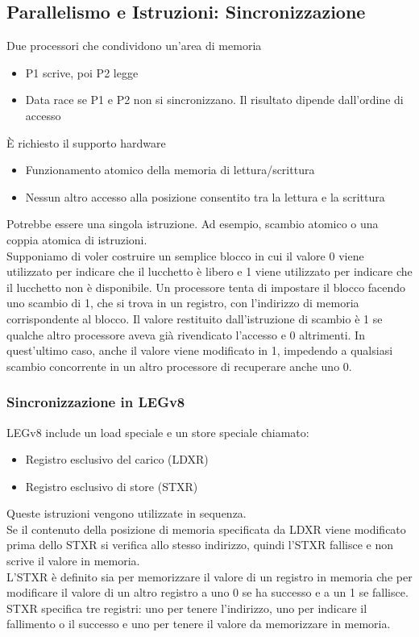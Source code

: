 \documentclass[12pt,a4paper]{article}
\begin{document}
\subsection{Parallelismo e Istruzioni: Sincronizzazione}
Due processori che condividono un'area di memoria\begin{itemize}
\item P1 scrive, poi P2 legge
\item Data race se P1 e P2 non si sincronizzano. Il risultato dipende dall'ordine di accesso
\end{itemize}
È richiesto il supporto hardware
\begin{itemize}
\item Funzionamento atomico della memoria di lettura/scrittura
\item Nessun altro accesso alla posizione consentito tra la lettura e la scrittura
\end{itemize}
Potrebbe essere una singola istruzione. Ad esempio, scambio atomico o una coppia atomica di istruzioni.\\
Supponiamo di voler costruire un semplice blocco in cui il valore 0 viene utilizzato per indicare che il lucchetto è libero e 1 viene utilizzato per indicare che il lucchetto non è disponibile. Un processore tenta di impostare il blocco facendo uno scambio di 1, che si trova in un registro, con l'indirizzo di memoria corrispondente al blocco. Il valore restituito dall'istruzione di scambio è 1 se qualche altro processore aveva già rivendicato l'accesso e 0 altrimenti. In quest'ultimo caso, anche il valore viene modificato in 1, impedendo a qualsiasi scambio concorrente in un altro processore di recuperare anche uno 0.

\subsubsection{Sincronizzazione in LEGv8}
LEGv8 include un load speciale e un store speciale chiamato:
\begin{itemize}
\item Registro esclusivo del carico (LDXR)
\item Registro esclusivo di store (STXR)
\end{itemize}
Queste istruzioni vengono utilizzate in sequenza.\\
Se il contenuto della posizione di memoria specificata da LDXR viene modificato prima dello STXR si verifica allo stesso indirizzo, quindi l'STXR fallisce e non scrive il valore in memoria.\\
L'STXR è definito sia per memorizzare il valore di un registro in memoria che per modificare il valore di un altro registro a uno 0 se ha successo e a un 1 se fallisce. STXR specifica tre registri: uno per tenere l'indirizzo, uno per indicare il fallimento o il successo e uno per tenere il valore da memorizzare in memoria.
\end{document}
